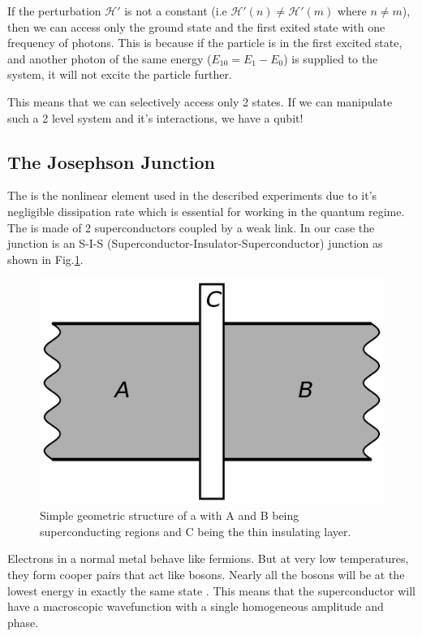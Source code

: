 If the perturbation $\mathcal{H}'$ is not a constant (i.e $\mathcal{H}'(n)\neq \mathcal{H}'(m)$ where $n\neq m$), then we can access only the ground state and the first exited state with one frequency of photons. This is because if the particle is in the first excited state, and another photon of the same energy ($E_{10}=E_1-E_0$) is supplied to the system, it will not excite the particle further.

This means that we can selectively access only 2 states. If we can manipulate such a 2 level system and it's interactions, we have a qubit!

\subsection{The Josephson Junction}

The \JJ is the nonlinear element used in the described experiments due to it's negligible dissipation rate which is essential for working in the quantum regime.\\
The \JJ is made of 2 superconductors coupled by a weak link. In our case the junction is an S-I-S (Superconductor-Insulator-Superconductor) junction as shown in Fig.\ref{fig:SISJJ}.

\begin{figure}
\centering
\includegraphics[width=\linewidth]{Figures/SISJJ}
\decoRule
\caption[Josephson Junction]{Simple geometric structure of a \JJ with A and B being superconducting regions and C being the thin insulating layer.}
\label{fig:SISJJ}
\end{figure}

Electrons in a normal metal behave like fermions. But at very low temperatures, they form cooper pairs that act like bosons. Nearly all the bosons will be at the lowest energy in exactly the same state \cite{Feynman1966}. This means that the superconductor will have a macroscopic wavefunction with a single homogeneous amplitude and phase.

